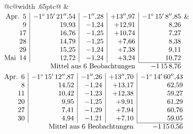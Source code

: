\noindent\begin{tabular}{@{}c@{\hspace{.4em}\vrule width .65pt\hspace{.4em}}c@{}}
 &
 \\[.18ex]
\(\begin{array}[t]{@{}r|r|r|r|r@{}}
\text{Apr.}\enspace 5 & -1^\circ\,15'\,21''{,}54 & -1''{,}28 & +13''{,}97 & -1^\circ\,15'\,8''{,}85\\
9 & 19{,}93 & -1{,}24 & +12{,}91 & 8{,}26\\
17 & 16{,}76 & -1{,}25 & +10{,}74 & 7{,}27\\
28 & 14{,}79 & -1{,}25 & +7{,}66 & 8{,}38\\
29 & 15{,}25 & -1{,}24 & +7{,}38 & 9{,}11\\
\text{Mai}\enspace 14 & 12{,}72 & -1{,}24 & +3{,}24 & 10{,}72\\
\cline{5-5}
\multicolumn{4}{r}{\text{Mittel aus 6 Beobachtungen}} & -1\,15\,8{,}76
\end{array}\)
&
\(\begin{array}[t]{@{}r|r|r|r|r@{}}
\text{Apr.}\enspace 6 & -1^\circ\,15'\,12''{,}87 & -1''{,}26 & +13''{,}70 & -1^\circ\,14'\,60''{,}43\\
8 & 14{,}52 & -1{,}24 & +13{,}17 & 62{,}59\\
11 & 10{,}42 & -1{,}23 & +12{,}38 & 59{,}27\\
20 & 9{,}95 & -1{,}25 & +9{,}91 & 61{,}29\\
27 & 7{,}41 & -1{,}29 & +7{,}94 & 60{,}76\\
30 & 4{,}94 & -1{,}21 & +7{,}10 & 59{,}05\\
\cline{5-5}
\multicolumn{4}{r}{\text{Mittel aus 6 Beobachtungen}} & -1\,15\,0{,}56
\end{array}\)
\end{tabular}\par\medskip
